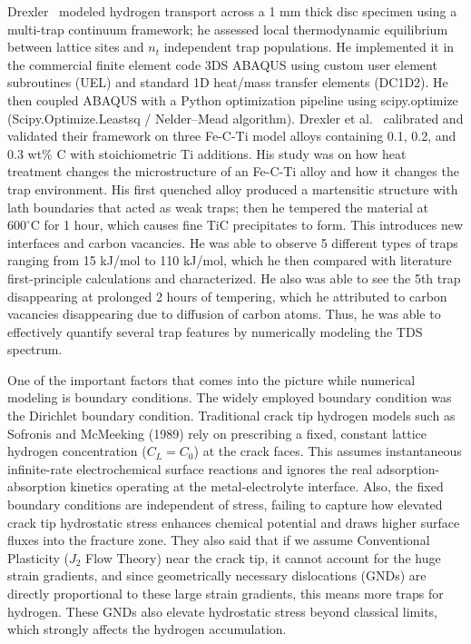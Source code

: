 \documentclass[a4paper,12pt,oneside]{report}
\begin{document}
Drexler~\cite{Drexler2019} modeled hydrogen transport across a 1 mm thick disc specimen using a multi-trap continuum framework; he assessed local thermodynamic equilibrium between lattice sites and $n_t$ independent trap populations. He implemented it in the commercial finite element code 3DS ABAQUS using custom user element subroutines (UEL) and standard 1D heat/mass transfer elements (DC1D2). He then coupled ABAQUS with a Python optimization pipeline using scipy.optimize (Scipy.Optimize.Leastsq / Nelder--Mead algorithm). Drexler et al.~\cite{Drexler2019} calibrated and validated their framework on three Fe-C-Ti model alloys containing 0.1, 0.2, and 0.3 wt\% C with stoichiometric Ti additions. His study was on how heat treatment changes the microstructure of an Fe-C-Ti alloy and how it changes the trap environment. His first quenched alloy produced a martensitic structure with lath boundaries that acted as weak traps; then he tempered the material at $600^\circ\text{C}$ for 1 hour, which causes fine TiC precipitates to form. This introduces new interfaces and carbon vacancies. He was able to observe 5 different types of traps ranging from 15 kJ/mol to 110 kJ/mol, which he then compared with literature first-principle calculations and characterized. He also was able to see the 5th trap disappearing at prolonged 2 hours of tempering, which he attributed to carbon vacancies disappearing due to diffusion of carbon atoms. Thus, he was able to effectively quantify several trap features by numerically modeling the TDS spectrum.

One of the important factors that comes into the picture while numerical modeling is boundary conditions. The widely employed boundary condition was the Dirichlet boundary condition. Traditional crack tip hydrogen models such as Sofronis and McMeeking (1989)\cite{SOFRONIS1989317} rely on prescribing a fixed, constant lattice hydrogen concentration ($C_L = C_0$) at the crack faces. This assumes instantaneous infinite-rate electrochemical surface reactions and ignores the real adsorption-absorption kinetics operating at the metal-electrolyte interface. Also, the fixed boundary conditions are independent of stress, failing to capture how elevated crack tip hydrostatic stress enhances chemical potential and draws higher surface fluxes into the fracture zone. They also said that if we assume Conventional Plasticity ($J_2$ Flow Theory) near the crack tip, it cannot account for the huge strain gradients, and since geometrically necessary dislocations (GNDs) are directly proportional to these large strain gradients, this means more traps for hydrogen. These GNDs also elevate hydrostatic stress beyond classical limits, which strongly affects the hydrogen accumulation. 
\end{document}
